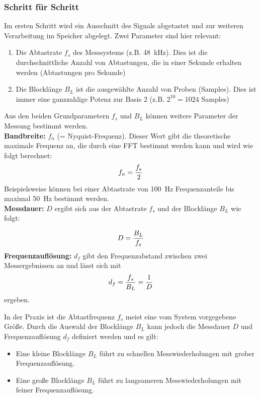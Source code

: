 \subsubsection{Schritt für Schritt}
Im ersten Schritt wird ein Ausschnitt des Signals abgetastet und zur weiteren Verarbeitung im Speicher abgelegt. Zwei Parameter sind hier relevant:
\begin{enumerate}
	\item Die Abtastrate $f_s$ des Messsystems (z.B. \SI{48}{\kilo\hertz}). Dies ist die durchschnittliche Anzahl von Abtastungen, die in einer Sekunde erhalten werden (Abtastungen pro Sekunde)
	\item Die Blocklänge $B_L$ ist die ausgewählte Anzahl von Proben (Samples). Dies ist immer eine ganzzahlige Potenz zur Basis 2 (z.B. $2^{10} = 1024$ Samples)
\end{enumerate}
Aus den beiden Grundparametern $f_s$ und $B_L$ können weitere Parameter der Messung bestimmt werden. \\
\textbf{Bandbreite:}  $f_n$ (= Nyquist-Frequenz). Dieser Wert gibt die theoretische maximale Frequenz an, die durch eine FFT bestimmt werden kann und wird wie folgt berechnet:
\begin{align}
	\centering
	f_n = \frac{f_s}{2}
	\label{gl:Nyquist-Frequenz}
\end{align}
Beispielsweise können bei einer Abtastrate von \SI{100}{\hertz} Frequenzanteile bis maximal \SI{50}{\hertz} bestimmt werden.\\
\textbf{Messdauer:} $D$ ergibt sich aus der Abtastrate $f_s$ und der Blocklänge $B_L$ wie folgt:

\begin{align}
	\centering
	D = \frac{B_L}{f_s}
	\label{gl:Messdauer}
\end{align}
\textbf{Frequenzauflösung:} $d_f$ gibt den Frequenzabstand zwischen zwei Messergebnissen an und lässt sich mit
\begin{align}
	\centering
	d_f = \frac{f_s}{B_L} = \frac{1}{D}
	\label{gl:Frequenzaufloesung}
\end{align}
ergeben.

In der Praxis ist die Abtastfrequenz $f_s$ meist eine vom System vorgegebene Größe. Durch die Auswahl der Blocklänge $B_L$ kann jedoch die Messdauer $D$ und Frequenzauflösung $d_f$ definiert werden und es gilt:\\
\begin{itemize}
	\item Eine kleine Blocklänge $B_L$ führt zu schnellen Messwiederholungen mit grober Frequenzauflösung.
	\item Eine große Blocklänge $B_L$ führt zu langsameren Messwiederholungen mit feiner Frequenzauflösung.
\end{itemize}
